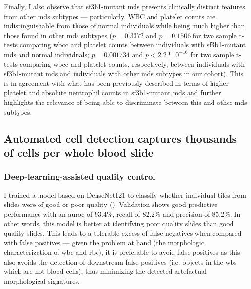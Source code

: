 Finally, I also observe that \ac{sf3b1}-mutant \ac{mds} presents clinically distinct features from other \ac{mds} subtypes --- particularly, WBC and platelet counts are indistinguishable from those of normal individuals while being much higher than those found in other \ac{mds} subtypes ($p=0.3372$ and $p=0.1506$ for two sample t-tests comparing \ac{wbcc} and platelet counts between individuals with \ac{sf3b1}-mutant \ac{mds} and normal individuals; $p=0.001734$ and $p<2.2*10^{-16}$ for two sample t-tests comparing \ac{wbcc} and platelet counts, respectively, between individuals with \ac{sf3b1}-mutant \ac{mds} and individuals with other \ac{mds} subtypes in our cohort). This is in agreement with what has been previously described in terms of higher platelet and absolute neutrophil counts in \ac{sf3b1}-mutant \ac{mds} \cite{Malcovati2015-tz,Malcovati2020-no} and further highlights the relevance of being able to discriminate between this and other \ac{mds} subtypes. 

\subsection{Automated cell detection captures thousands of cells per whole blood slide}

\subsubsection{Deep-learning-assisted quality control}

I trained a model based on DenseNet121 to classify whether individual tiles from slides were of good or poor quality (). Validation shows good predictive performance with an \ac{auroc} of 93.4\%, recall of 82.2\% and precision of 85.2\%. In other words, this model is better at identifying poor quality slides than good quality slides. This leads to a tolerable excess of false negatives when compared with false positives --- given the problem at hand (the morphologic characterization of \ac{wbc} and \ac{rbc}), it is preferable to avoid false positives as this also avoids the detection of downstream false positives (i.e. objects in the \ac{wbs} which are not blood cells), thus minimizing the detected artefactual morphological signatures.

\begin{figure}[!ht]
    \label{fig:slide-quality-examples}
\end{figure}

